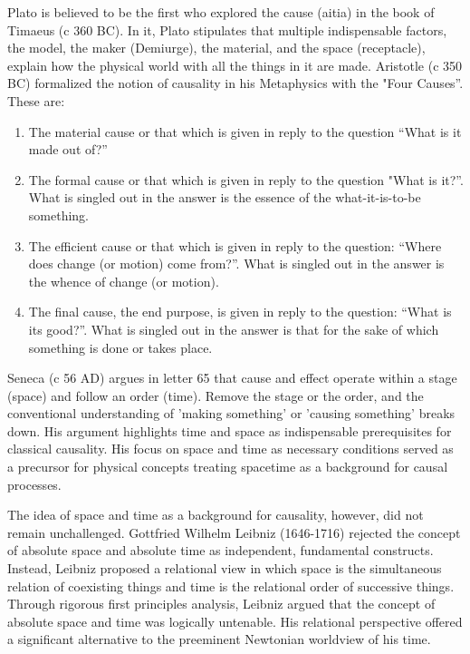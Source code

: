 \documentclass{article}
\begin{document}
Plato is believed to be the first who explored the cause (aitia) in the book of Timaeus (c 360 BC). In it, Plato stipulates that multiple indispensable factors, the model, the maker (Demiurge), the material, and the space (receptacle), explain how the physical world with all the things in it are made\cite{PlatoTimaeusSEP}. Aristotle (c 350 BC) formalized the notion of causality in his Metaphysics\cite{AristotleMetaphysicsSEP} with the  "Four Causes”\cite{AristotleCausalitySEP}. These are:

\begin{enumerate}
    \item The material cause or that which is given in reply to the question “What is it made out of?”
    \item The formal cause or that which is given in reply to the question "What is it?”. What is singled out in the answer is the essence of the what-it-is-to-be something.
    \item The efficient cause or that which is given in reply to the question: “Where does change (or motion) come from?”. What is singled out in the answer is the whence of change (or motion).
    \item The final cause, the end purpose, is given in reply to the question: “What is its good?”. What is singled out in the answer is that for the sake of which something is done or takes place.
\end{enumerate}

Seneca (c 56 AD) argues in letter 65\cite{SenecaLetters} that cause and effect operate within a stage (space) and follow an order (time). Remove the stage or the order, and the conventional understanding of 'making something' or 'causing something' breaks down. His argument highlights time and space as indispensable prerequisites for classical causality. His focus on space and time as necessary conditions served as a precursor for physical concepts treating spacetime as a background for causal processes.

The idea of space and time as a background for causality, however, did not remain unchallenged. Gottfried Wilhelm Leibniz (1646-1716) rejected the concept of absolute space and absolute time as independent, fundamental constructs. Instead, Leibniz proposed\cite{LeibnizPhysicsSEP} a relational view in which space is the simultaneous relation of coexisting things and time is the relational order of successive things.
Through rigorous first principles analysis, Leibniz argued that the concept of absolute space and time was logically untenable.
His relational perspective offered a significant alternative to the preeminent Newtonian worldview of his time.
\end{document}
